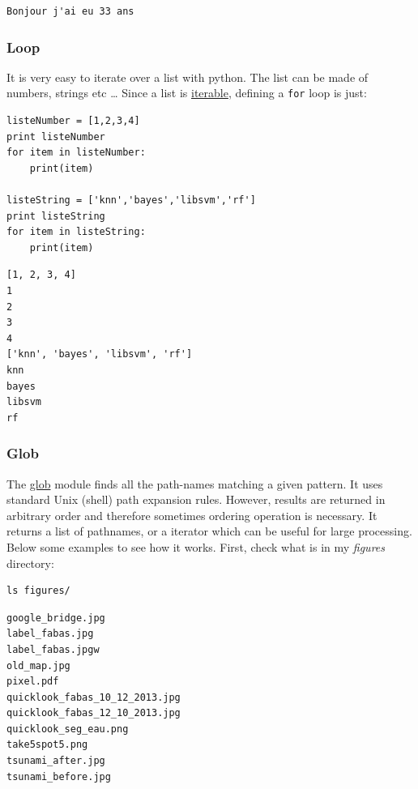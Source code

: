\documentclass[a4paper,11pt,DIV=18]{scrartcl}
\begin{document}
\begin{verbatim}
Bonjour j'ai eu 33 ans
\end{verbatim}

\subsubsection{Loop}
\label{sec:orgheadline49}
It is very  easy to iterate over  a list with python. The  list can be
made of numbers, strings etc \ldots{}  Since a list is \href{https://docs.python.org/2/glossary.html}{iterable}, defining a
\texttt{for} loop is just:

\begin{verbatim}
listeNumber = [1,2,3,4]
print listeNumber
for item in listeNumber:
    print(item)

listeString = ['knn','bayes','libsvm','rf']
print listeString
for item in listeString:
    print(item)
\end{verbatim}

\begin{verbatim}
[1, 2, 3, 4]
1
2
3
4
['knn', 'bayes', 'libsvm', 'rf']
knn
bayes
libsvm
rf
\end{verbatim}

\subsubsection{Glob}
\label{sec:orgheadline50}
The \href{https://docs.python.org/2/library/glob.html}{glob} module finds all the  path-names matching a given pattern. It
uses standard Unix (shell) path  expansion rules. However, results are
returned in arbitrary order and therefore sometimes ordering operation
is necessary. It returns a list  of pathnames, or a iterator which can
be useful  for large  processing. Below  some examples  to see  how it
works. First, check what is in my \emph{figures} directory:

\begin{verbatim}
ls figures/
\end{verbatim}

\begin{verbatim}
google_bridge.jpg
label_fabas.jpg
label_fabas.jpgw
old_map.jpg
pixel.pdf
quicklook_fabas_10_12_2013.jpg
quicklook_fabas_12_10_2013.jpg
quicklook_seg_eau.png
take5spot5.png
tsunami_after.jpg
tsunami_before.jpg
\end{verbatim}
\end{document}
